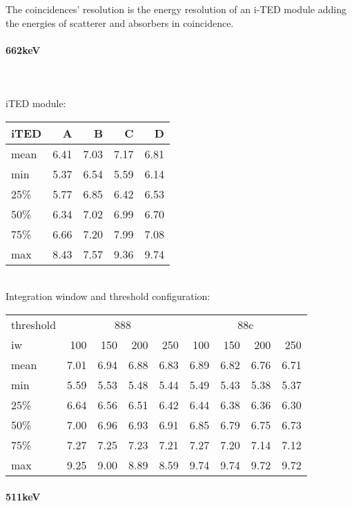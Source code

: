 The coincidences' resolution is the energy resolution of an i-TED module adding the energies of scatterer and absorbers in coincidence.

\paragraph*{662keV}\\~\\

iTED module:\\

\begin{tabular}{lrrrr}
    \toprule
    iTED &    A &    B &    C &    D \\
    \midrule
    mean & 6.41 & 7.03 & 7.17 & 6.81 \\
    min  & 5.37 & 6.54 & 5.59 & 6.14 \\
    25\%  & 5.77 & 6.85 & 6.42 & 6.53 \\
    50\%  & 6.34 & 7.02 & 6.99 & 6.70 \\
    75\%  & 6.66 & 7.20 & 7.99 & 7.08 \\
    max  & 8.43 & 7.57 & 9.36 & 9.74 \\
    \bottomrule
\end{tabular}\\

Integration window and threshold configuration:\\

\begin{tabular}{lrrrrrrrr}
    \toprule
    threshold & \multicolumn{4}{c}{888} & \multicolumn{4}{c}{88c} \\
    iw &  100 &  150 &  200 &  250 &  100 &  150 &  200 &  250 \\
    \midrule
    mean & 7.01 & 6.94 & 6.88 & 6.83 & 6.89 & 6.82 & 6.76 & 6.71 \\
    min  & 5.59 & 5.53 & 5.48 & 5.44 & 5.49 & 5.43 & 5.38 & 5.37 \\
    25\%  & 6.64 & 6.56 & 6.51 & 6.42 & 6.44 & 6.38 & 6.36 & 6.30 \\
    50\%  & 7.00 & 6.96 & 6.93 & 6.91 & 6.85 & 6.79 & 6.75 & 6.73 \\
    75\%  & 7.27 & 7.25 & 7.23 & 7.21 & 7.27 & 7.20 & 7.14 & 7.12 \\
    max  & 9.25 & 9.00 & 8.89 & 8.59 & 9.74 & 9.74 & 9.72 & 9.72 \\
    \bottomrule
\end{tabular}

\paragraph*{511keV}

